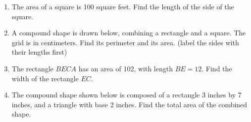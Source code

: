 \begin{enumerate}
\item The area of a square is 100 square feet. Find the length of the side of the square.

\newpage
\item A compound shape is drawn below, combining a rectangle and a square. The grid is in centimeters. Find its perimeter and its area. (label the sides with their lengths first)
    \begin{flushleft}
    \end{flushleft} \vspace{1cm} 

\item The rectangle $BECA$ has an area of 102, with length $BE=12$. Find the width of the rectangle $EC$. \par

\item The compound shape shown below is composed of a rectangle 3 inches by 7 inches, and a triangle with base 2 inches. Find the total area of the combined shape.\vspace{0.5cm} 
  \begin{flushleft}
  \end{flushleft}


\end{enumerate}
